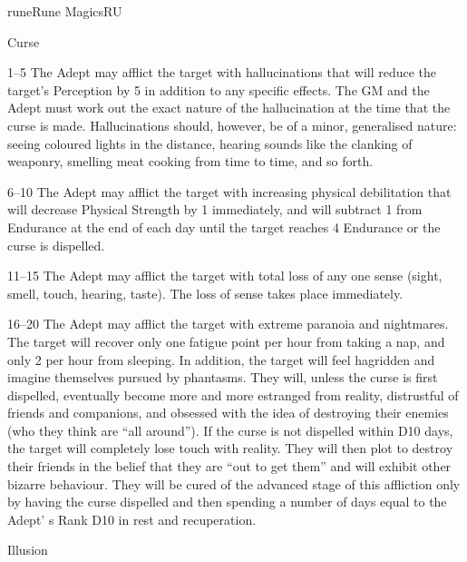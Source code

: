 \begin{college}[1.1]{rune}{Rune Magics}{RU}
\begin{spell}[G-5]{Curse}
\begin{effects}
\begin{Description}
\item[1--5]
The Adept may afflict the target with hallucinations that will reduce
the target's Perception by 5 in addition to any specific effects.  The
GM and the Adept must work out the exact nature of the hallucination
at the time that the curse is made.  Hallucinations should, however,
be of a minor, generalised nature: seeing coloured lights in the
distance, hearing sounds like the clanking of weaponry, smelling meat
cooking from time to time, and so forth.

\item[6--10]
The Adept may afflict the target with increasing physical debilitation
that will decrease Physical Strength by 1 immediately, and will
subtract 1 from Endurance at the end of each day until the target
reaches 4 Endurance or the curse is dispelled.

\item[11--15]
The Adept may afflict the target with total loss of any one sense
(sight, smell, touch, hearing, taste).  The loss of sense takes place
immediately.

\item[16--20]
The Adept may afflict the target with extreme paranoia and
nightmares. The target will recover only one fatigue point per hour
from taking a nap, and only 2 per hour from sleeping.  In addition,
the target will feel hagridden and imagine themselves pursued by
phantasms.  They will, unless the curse is first dispelled, eventually
become more and more estranged from reality, distrustful of friends
and companions, and obsessed with the idea of destroying their enemies
(who they think are ``all around''). If the curse is not dispelled
within D10  days, the target
will completely lose touch with reality. They will then plot to
destroy their friends in the belief that they are ``out to get them''
and will exhibit other bizarre behaviour.  They will be cured of the
advanced stage of this affliction only by having the curse dispelled
and then spending a number of days equal to the Adept' s Rank \x D10
in rest and recuperation.
\end{Description}
\end{effects}
\end{spell}

\begin{spell}[G-6]{Illusion}


\end{spell}
\end{college}
